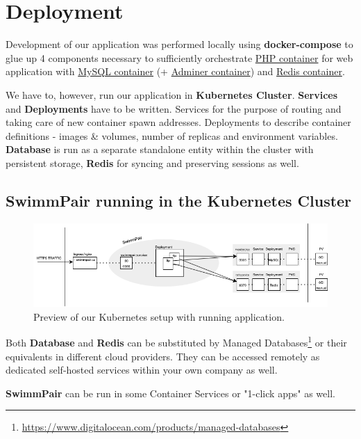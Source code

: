 \chapter{Deployment}
Development of our application was performed locally using \textbf{docker-compose} to glue up 4 components necessary to sufficiently orchestrate \underline{PHP container} for web application with \underline{MySQL container} (+ \underline{Adminer container}) and \underline{Redis container}.
\par
We have to, however, run our application in \textbf{Kubernetes Cluster}. \textbf{Services} and \textbf{Deployments} have to be written. Services for the purpose of routing and taking care of new container spawn addresses. Deployments to describe container definitions - images \& volumes, number of replicas and environment variables. \textbf{Database} is run as a separate standalone entity within the cluster with persistent storage, \textbf{Redis} for syncing and preserving sessions as well.
\newline
\par
\section*{SwimmPair running in the Kubernetes Cluster}
\par
\begin{figure}[h]
    \centering	
    \includegraphics[scale=0.52]{img/swimmpair_deployment_k8s.png}
    \caption{Preview of our Kubernetes setup with running application.}
    \label{fig5.1:deplk8s}
\end{figure}
Both \textbf{Database} and \textbf{Redis} can be substituted by Managed Databases\footnote{\url{https://www.digitalocean.com/products/managed-databases}} or their equivalents in different cloud providers. They can be accessed remotely as dedicated self-hosted services within your own company as well.
\par \textbf{SwimmPair} can be run in some Container Services or "1-click apps" as well. 
